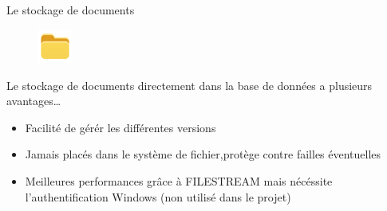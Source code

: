 \begin{frame}{Le stockage de documents}
\begin{figure}[h!]
  \includegraphics[width=0.10\textwidth]{images/iconfinder_website_-_folder_3440836}
\end{figure}
  Le stockage de documents directement dans la base de données a plusieurs avantages\dots
  \begin{itemize}
  \item Facilité de gérér les différentes versions
  \item Jamais placés dans le système de fichier,protège contre failles éventuelles
  \item Meilleures performances grâce à FILESTREAM mais nécéssite l'authentification Windows (non utilisé dans le projet)
  \end{itemize}
\end{frame}